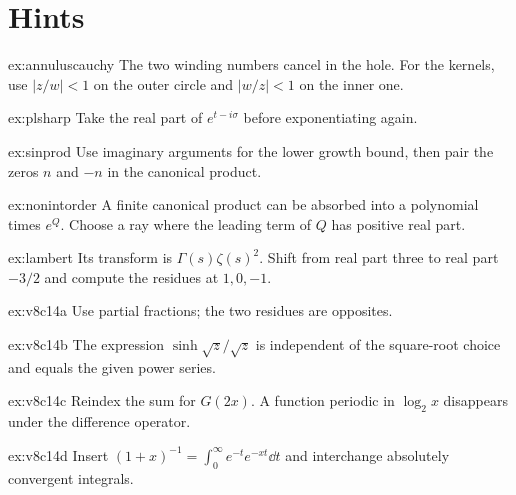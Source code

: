 \section{Hints}
\begin{hint}{ex:annuluscauchy}
The two winding numbers cancel in the hole. For the kernels, use $|z/w|<1$ on the outer circle and $|w/z|<1$ on the inner one.
\end{hint}
\begin{hint}{ex:plsharp}
Take the real part of $e^{t-i\sigma}$ before exponentiating again.
\end{hint}
\begin{hint}{ex:sinprod}
Use imaginary arguments for the lower growth bound, then pair the zeros $n$ and $-n$ in the canonical product.
\end{hint}
\begin{hint}{ex:nonintorder}
A finite canonical product can be absorbed into a polynomial times $e^Q$. Choose a ray where the leading term of $Q$ has positive real part.
\end{hint}
\begin{hint}{ex:lambert}
Its transform is $\Gamma(s)\zeta(s)^2$. Shift from real part three to real part $-3/2$ and compute the residues at $1,0,-1$.
\end{hint}
\begin{hint}{ex:v8c14a}
Use partial fractions; the two residues are opposites.
\end{hint}
\begin{hint}{ex:v8c14b}
The expression $\sinh\sqrt z/\sqrt z$ is independent of the square-root choice and equals the given power series.
\end{hint}
\begin{hint}{ex:v8c14c}
Reindex the sum for $G(2x)$. A function periodic in $\log_2x$ disappears under the difference operator.
\end{hint}
\begin{hint}{ex:v8c14d}
Insert $(1+x)^{-1}=\int_0^\infty e^{-t}e^{-xt}\dd t$ and interchange absolutely convergent integrals.
\end{hint}

